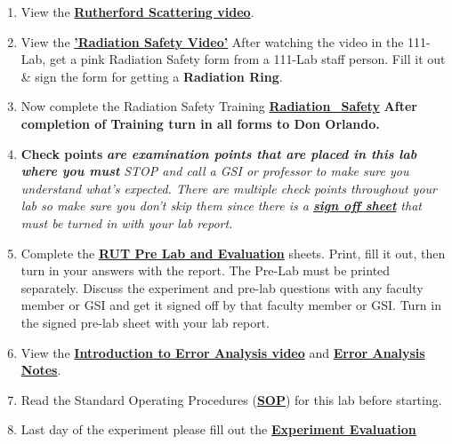 \documentclass{../lab}
\begin{document}
\begin{enumerate}
    \item View the \href{http://youtu.be/xHzzXiMEmaU}{\textbf{Rutherford Scattering video}}.

    \item View the \href{http://youtu.be/KHxtzF5pZZM}{\textbf{'\textbf{Radiation Safety Video'}}} After watching the video in the 111-Lab, get a pink Radiation Safety form from a 111-Lab staff person. Fill it out \& sign the form for getting a \textbf{Radiation Ring}.

    \item Now complete the Radiation Safety Training \href{http://experimentationlab.berkeley.edu/RadiationSafety}{\textbf{Radiation\_Safety}} \textbf{After completion of Training turn in all forms to Don Orlando.}

    \item \textbf{Check points} \emph{\textbf{are examination points that are placed in this lab where you must }}\emph{STOP and call a GSI or professor to make sure you understand what's expected. There are multiple check points throughout your lab so make sure you don't skip them since there is a \href{http://experimentationlab.berkeley.edu/rutcheckpoints}{\textbf{sign off sheet}} that must be turned in with your lab report.}

    \item Complete the \href{http://experimentationlab.berkeley.edu/RUTPreLab}{\textbf{RUT Pre Lab and Evaluation}} sheets. Print,  fill it out, then turn in your answers with the report. The Pre-Lab must be printed separately. Discuss the experiment and pre-lab questions with any faculty member or GSI and get it signed off by that faculty member or GSI. Turn in the signed pre-lab sheet with your lab report.

    \item View the \href{\ErrorAnalysisVideo}{\textbf{Introduction to Error Analysis video}} and \href{http://experimentationlab.berkeley.edu/EAX}{\textbf{Error Analysis Notes}}.

    \item Read the Standard Operating Procedures (\href{http://experimentationlab.berkeley.edu/sites/default/files/images/SOP\_3271\_Cs-137\_Na-22\_Co-60\_Mn-54\_Am-241\_Fe-55\_2014.pdf}{\textbf{SOP}}) for this lab before starting.

    \item Last day of the experiment please fill out the \href{\ExperimentEvaluation}{\textbf{Experiment Evaluation}}

\end{enumerate}
\end{document}
